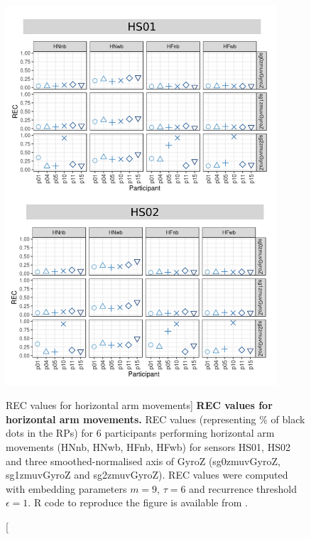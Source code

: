\begin{figure}
\centering
\includegraphics[width=0.9\textwidth]{rqa_rec_H_w500}
    \caption
	[REC values for horizontal arm movements]{
	{\bf REC values for horizontal arm movements.}	
	REC values (representing \% of black dots in the RPs) for 
	6 participants performing horizontal arm movements 
	(HNnb, HNwb, HFnb, HFwb)
	for sensors HS01, HS02 and three smoothed-normalised axis 
	of GyroZ (sg0zmuvGyroZ, sg1zmuvGyroZ and sg2zmuvGyroZ).
	REC values were computed with 
	embedding parameters $m=9$, $\tau=6$ and recurrence threshold
	$\epsilon=1$.
	R code to reproduce the figure is available from \cite{hwum2018}.
        }
    \label{fig:rqa_rec_H}
\end{figure}
